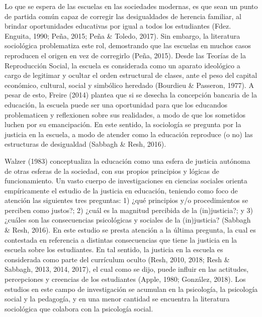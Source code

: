 \documentclass[12pt,twoside]{templates/facsothesis}
\begin{document}
Lo que se espera de las escuelas en las sociedades modernas, es que sean un punto de partida común capaz de corregir las desigualdades de herencia familiar, al brindar oportunidades educativas por igual a todos los estudiantes (Fdez. Enguita, 1990; Peña, 2015; Peña \& Toledo, 2017). Sin embargo, la literatura sociológica problematiza este rol, demostrando que las escuelas en muchos casos reproducen el origen en vez de corregirlo (Peña, 2015). Desde las Teorías de la Reproducción Social, la escuela es considerada como un aparato ideológico a cargo de legitimar y ocultar el orden estructural de clases, ante el peso del capital económico, cultural, social y simbólico heredado (Bourdieu \& Passeron, 1977). A pesar de esto, Freire (2014) plantea que si se desecha la concepción bancaria de la educación, la escuela puede ser una oportunidad para que los educandos problematicen y reflexionen sobre sus realidades, a modo de que los sometidos luchen por su emancipación. En este sentido, la sociología se pregunta por la justicia en la escuela, a modo de atender como la educación reproduce (o no) las estructuras de desigualdad (Sabbagh \& Resh, 2016).

Walzer (1983) conceptualiza la educación como una esfera de justicia autónoma de otras esferas de la sociedad, con sus propios principios y lógicas de funcionamiento. Un vasto cuerpo de investigaciones en ciencias sociales orienta empíricamente el estudio de la justicia en educación, teniendo como foco de atención las siguientes tres preguntas: 1) ¿qué principios y/o procedimientos se perciben como justos?; 2) ¿cuál es la magnitud percibida de la (in)justicia?; y 3) ¿cuáles son las consecuencias psicológicas y sociales de la (in)justicia? (Sabbagh \& Resh, 2016). En este estudio se presta atención a la última pregunta, la cual es contestada en referencia a distintas consecuencias que tiene la justicia en la escuela sobre los estudiantes. En tal sentido, la justicia en la escuela es considerada como parte del currículum oculto (Resh, 2010, 2018; Resh \& Sabbagh, 2013, 2014, 2017), el cual como se dijo, puede influir en las actitudes, percepciones y creencias de los estudiantes (Apple, 1980; González, 2018). Los estudios en este campo de investigación se acumulan en la psicología, la psicología social y la pedagogía, y en una menor cantidad se encuentra la literatura sociológica que colabora con la psicología social.
\end{document}
